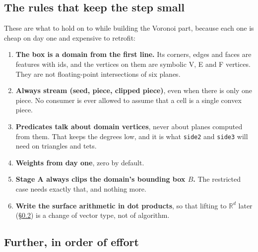 \documentclass[11pt,a4paper]{article}
\newcommand{\code}[1]{\texttt{#1}}          %
\newcommand{\R}{\mathbb{R}}
\newcommand{\secref}[1]{\S\ref{#1}}
\begin{document}
\subsection{The rules that keep the step small}\label{ssec:rules}

These are what to hold on to while building the Voronoi part, because each one is cheap on day
one and expensive to retrofit:

\begin{enumerate}
\item \textbf{The box is a domain from the first line.} Its corners, edges and faces are features
  with ids, and the vertices on them are symbolic V, E and F vertices. They are not
  floating-point intersections of six planes.
\item \textbf{Always stream (seed, piece, clipped piece)}, even when there is only one piece. No
  consumer is ever allowed to assume that a cell is a single convex piece.
\item \textbf{Predicates talk about domain vertices}, never about planes computed from them. That
  keeps the degrees low, and it is what \code{side2} and \code{side3} will need on triangles and
  tets.
\item \textbf{Weights from day one}, zero by default.
\item \textbf{Stage A always clips the domain's bounding box $B$.} The restricted case needs
  exactly that, and nothing more.
\item \textbf{Write the surface arithmetic in dot products}, so that lifting to $\R^d$ later
  (\secref{ssec:further}) is a change of vector type, not of algorithm.
\end{enumerate}

\subsection{Further, in order of effort}\label{ssec:further}
\end{document}
